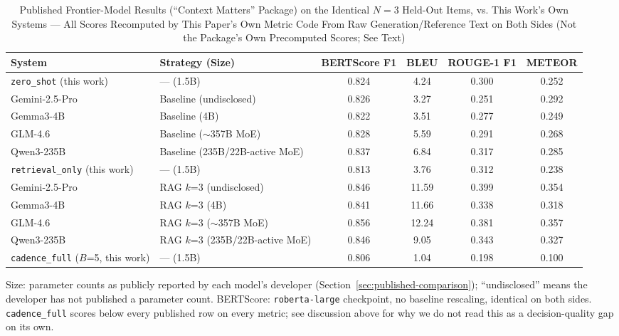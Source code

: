 \documentclass[lettersize,journal]{IEEEtran}
\begin{document}
\begin{table}[t]
\caption{Published Frontier-Model Results (``Context Matters'' Package) on the Identical $N=3$ Held-Out Items, vs. This Work's Own Systems --- All Scores Recomputed by This Paper's Own Metric Code From Raw Generation/Reference Text on Both Sides (Not the Package's Own Precomputed Scores; See Text)\label{tab:published}}
\centering
\begin{tabular}{@{}llcccc@{}}
\toprule
System & Strategy (Size) & BERTScore F1 & BLEU & ROUGE-1 F1 & METEOR \\
\midrule
\texttt{zero\_shot} (this work)      & --- (1.5B)                    & 0.824 & 4.24  & 0.300 & 0.252 \\
Gemini-2.5-Pro                       & Baseline (undisclosed)        & 0.826 & 3.27  & 0.251 & 0.292 \\
Gemma3-4B                            & Baseline (4B)                 & 0.822 & 3.51  & 0.277 & 0.249 \\
GLM-4.6                              & Baseline ($\sim$357B MoE)     & 0.828 & 5.59  & 0.291 & 0.268 \\
Qwen3-235B                           & Baseline (235B/22B-active MoE)& 0.837 & 6.84  & 0.317 & 0.285 \\
\midrule
\texttt{retrieval\_only} (this work) & --- (1.5B)                    & 0.813 & 3.76  & 0.312 & 0.238 \\
Gemini-2.5-Pro                       & RAG $k$=3 (undisclosed)       & 0.846 & 11.59 & 0.399 & 0.354 \\
Gemma3-4B                            & RAG $k$=3 (4B)                & 0.841 & 11.66 & 0.338 & 0.318 \\
GLM-4.6                              & RAG $k$=3 ($\sim$357B MoE)    & 0.856 & 12.24 & 0.381 & 0.357 \\
Qwen3-235B                           & RAG $k$=3 (235B/22B-active MoE)& 0.846 & 9.05 & 0.343 & 0.327 \\
\midrule
\texttt{cadence\_full} ($B$=5, this work) & --- (1.5B)               & 0.806 & 1.04  & 0.198 & 0.100 \\
\bottomrule
\end{tabular}

\vspace{2pt}
\footnotesize Size: parameter counts as publicly reported by each model's developer (Section~\ref{sec:published-comparison}); ``undisclosed'' means the developer has not published a parameter count. BERTScore: \texttt{roberta-large} checkpoint, no baseline rescaling, identical on both sides. \texttt{cadence\_full} scores below every published row on every metric; see discussion above for why we do not read this as a decision-quality gap on its own.
\end{table}
\end{document}
